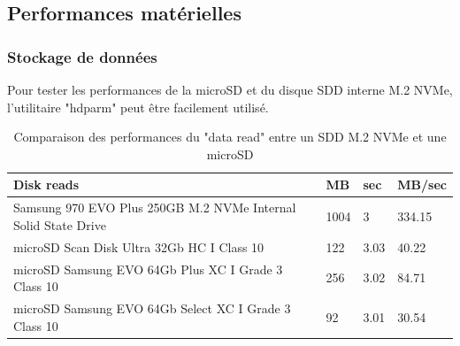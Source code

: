 ﻿\subsection{Performances matérielles}
\subsubsection{Stockage de données}
\noindent Pour tester les performances de la microSD et du disque SDD interne M.2 NVMe, l'utilitaire "hdparm" peut être facilement utilisé. 
{
   \vspace{0.1em} %
   \renewcommand*{\arraystretch}{1.4}
   \begin{longtable}[t]{@{}|p{28em}|p{2em}|p{2em}|p{3em}|@{}} 
      \caption{Comparaison des performances du "data read" entre un SDD M.2 NVMe et une microSD}\label{tab:Timing O_DIRECT disk reads}\\
      \hline
      \textbf{Disk reads} & \textbf{MB} & \textbf{sec} & \textbf{MB/sec}\\
      \hline
      Samsung 970 EVO Plus 250GB M.2 NVMe Internal Solid State Drive & 1004 & 3 & 334.15\\
      \hline
      microSD Scan Disk Ultra 32Gb HC I Class 10 & 122 & 3.03 & 40.22\\
      \hline
      microSD Samsung EVO 64Gb Plus XC I Grade 3 Class 10 & 256 & 3.02 & 84.71\\
      \hline
      microSD Samsung EVO 64Gb Select XC I Grade 3 Class 10 & 92 & 3.01 & 30.54\\
      \hline
   \end{longtable}
}
